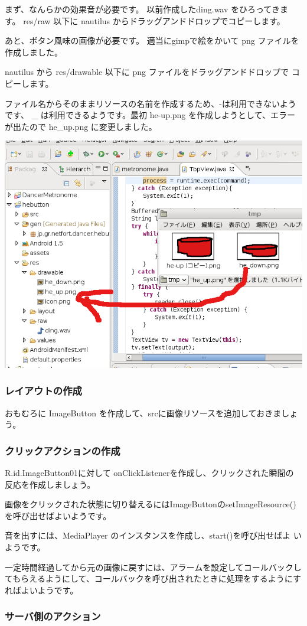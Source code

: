 \documentclass[mingoth,a4paper]{jsarticle}
\begin{document}
\begin{commandline}
まず、なんらかの効果音が必要です。
以前作成したding.wav をひろってきます。
res/raw 以下に nautilus からドラッグアンドドロップでコピーします。

あと、ボタン風味の画像が必要です。
適当にgimpで絵をかいて png ファイルを作成しました。

nautilus から res/drawable 以下に png ファイルをドラッグアンドドロップで
コピーします。

ファイル名からそのままリソースの名前を作成するため、-は利用できないよう
です、 \_ は利用できるようです。最初 he-up.png を作成しようとして、エラー
が出たので he\_up.png に変更しました。

\includegraphics[width=0.5\hsize]{image200905/dragdrop.png}

\subsubsection{レイアウトの作成}

おもむろに ImageButton を作成して、srcに画像リソースを追加しておきましょ
う。

\subsubsection{クリックアクションの作成}

R.id.ImageButton01に対して onClickListenerを作成し、クリックされた瞬間の
反応を作成しましょう。

画像をクリックされた状態に切り替えるにはImageButtonのsetImageResource()
を呼び出せばよいようです。

音を出すには、MediaPlayer のインスタンスを作成し、start()を呼び出せばよ
いようです。

一定時間経過してから元の画像に戻すには、アラームを設定してコールバックし
てもらえるようにして、コールバックを呼び出されたときに処理をするようにす
ればよいようです。

\subsubsection{サーバ側のアクション}


\end{commandline}
\end{document}
